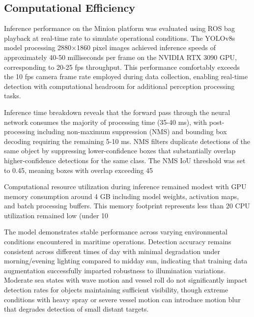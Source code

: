 \subsection{Computational Efficiency} \label{sec:yolo_efficiency}

Inference performance on the Minion platform was evaluated using ROS bag playback at real-time rate to simulate operational conditions.
The YOLOv8s model processing 2880×1860 pixel images achieved inference speeds of approximately 40-50 milliseconds per frame on the NVIDIA RTX 3090 GPU, corresponding to 20-25 \ac{fps} throughput.
This performance comfortably exceeds the 10 \ac{fps} camera frame rate employed during data collection, enabling real-time detection with computational headroom for additional perception processing tasks.

Inference time breakdown reveals that the forward pass through the neural network consumes the majority of processing time (35-40 ms), with post-processing including non-maximum suppression (NMS) and bounding box decoding requiring the remaining 5-10 ms.
NMS filters duplicate detections of the same object by suppressing lower-confidence boxes that substantially overlap higher-confidence detections for the same class.
The NMS IoU threshold was set to 0.45, meaning boxes with overlap exceeding 45%

Computational resource utilization during inference remained modest with GPU memory consumption around 4 GB including model weights, activation maps, and batch processing buffers.
This memory footprint represents less than 20%
CPU utilization remained low (under 10%

The model demonstrates stable performance across varying environmental conditions encountered in maritime operations.
Detection accuracy remains consistent across different times of day with minimal degradation under morning/evening lighting compared to midday sun, indicating that training data augmentation successfully imparted robustness to illumination variations.
Moderate sea states with wave motion and vessel roll do not significantly impact detection rates for objects maintaining sufficient visibility, though extreme conditions with heavy spray or severe vessel motion can introduce motion blur that degrades detection of small distant targets.


